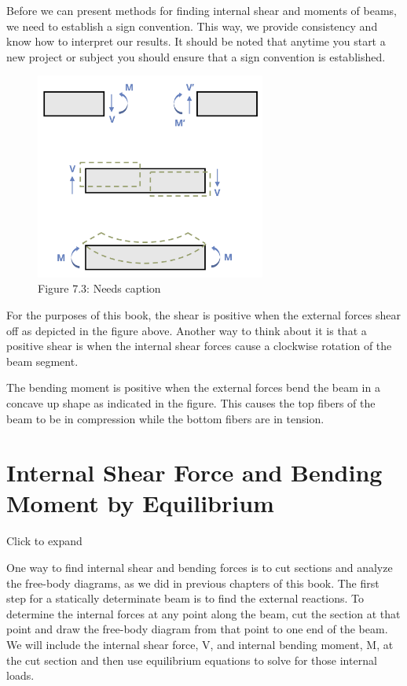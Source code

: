 \documentclass[
  letterpaper,
  DIV=11,
  numbers=noendperiod]{scrreprt}
\theoremstyle{definition}
\theoremstyle{remark}
\begin{document}
Before we can present methods for finding internal shear and moments of
beams, we need to establish a sign convention. This way, we provide
consistency and know how to interpret our results. It should be noted
that anytime you start a new project or subject you should ensure that a
sign convention is established.

\begin{figure}[H]

{\centering \includegraphics[width=2.97917in,height=\textheight]{images/CH7 PNGs/figure 7.3.png}

}

\caption{Figure 7.3: Needs caption}

\end{figure}%

For the purposes of this book, the shear is positive when the external
forces shear off as depicted in the figure above. Another way to think
about it is that a positive shear is when the internal shear forces
cause a clockwise rotation of the beam segment.

The bending moment is positive when the external forces bend the beam in
a concave up shape as indicated in the figure. This causes the top
fibers of the beam to be in compression while the bottom fibers are in
tension.

\section{Internal Shear Force and Bending Moment by
Equilibrium}\label{sec-7.1}

Click to expand

One way to find internal shear and bending forces is to cut sections and
analyze the free-body diagrams, as we did in previous chapters of this
book. The first step for a statically determinate beam is to find the
external reactions. To determine the internal forces at any point along
the beam, cut the section at that point and draw the free-body diagram
from that point to one end of the beam. We will include the internal
shear force, V, and internal bending moment, M, at the cut section and
then use equilibrium equations to solve for those internal loads.
\end{document}
